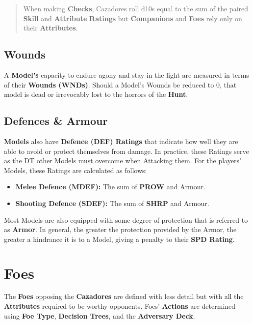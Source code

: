 \documentclass[
]{book}
\providecommand{\tightlist}{%
  \setlength{\itemsep}{0pt}\setlength{\parskip}{0pt}}
\begin{document}
\begin{quote}
When making \textbf{Checks}, Cazadores roll d10s equal to the sum of the paired \textbf{Skill} and \textbf{Attribute} \textbf{Ratings} but \textbf{Companions} and \textbf{Foes} rely only on their \textbf{Attributes}.
\end{quote}

\hypertarget{wounds}{%
\subsection*{Wounds}\label{wounds}}

A \textbf{Model's} capacity to endure agony and stay in the fight are measured in terms of their \textbf{Wounds (WNDs)}. Should a Model's Wounds be reduced to 0, that model is dead or irrevocably lost to the horrors of the \textbf{Hunt}.

\hypertarget{defence}{%
\subsection*{Defences \& Armour}\label{defence}}

\textbf{Models} also have \textbf{Defence (DEF) Ratings} that indicate how well they are able to avoid or protect themselves from damage. In practice, these Ratings serve as the DT other Models must overcome when Attacking them. For the players' Models, these Ratings are calculated as follows:

\begin{itemize}
\tightlist
\item
  \textbf{Melee Defence (MDEF):} The sum of \textbf{PROW} and Armour.
\item
  \textbf{Shooting Defence (SDEF):} The sum of \textbf{SHRP} and Armour.
\end{itemize}

Most Models are also equipped with some degree of protection that is referred to as \textbf{Armor}. In general, the greater the protection provided by the Armor, the greater a hindrance it is to a Model, giving a penalty to their \textbf{SPD Rating}.

\hypertarget{foes}{%
\section{Foes}\label{foes}}

The \textbf{Foes} opposing the \textbf{Cazadores} are defined with less detail but with all the \textbf{Attributes} required to be worthy opponents. Foes' \textbf{Actions} are determined using \textbf{Foe Type}, \textbf{Decision Trees}, and the \textbf{Adversary Deck}.
\end{document}
